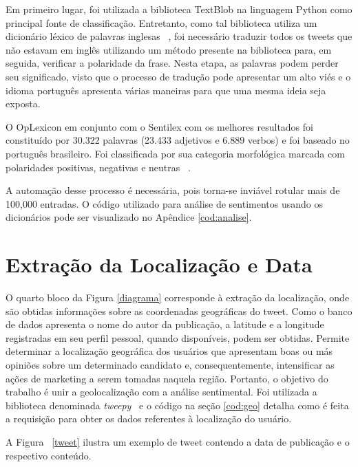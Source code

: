 Em primeiro lugar, foi utilizada a biblioteca TextBlob na linguagem Python como principal fonte de classificação. Entretanto, 
como tal biblioteca utiliza um dicionário léxico de palavras inglesas ~\cite{miller1995wordnet}, foi necessário traduzir todos os tweets que não estavam 
em inglês utilizando um método presente na biblioteca para, em seguida, verificar a polaridade da frase. Nesta etapa, as palavras
 podem perder seu significado, visto que o processo de tradução pode apresentar um alto viés e o idioma português apresenta várias maneiras para que uma mesma ideia seja exposta.


O OpLexicon em conjunto com o Sentilex com os melhores resultados foi constituído
por 30.322 palavras (23.433 adjetivos e 6.889 verbos) e foi
baseado no português brasileiro. Foi classificada por sua
categoria morfológica marcada com polaridades positivas,
negativas e neutras ~\cite{souza2011construction}.


A automação desse processo é necessária, pois torna-se inviável rotular mais de 100,000 entradas. 
O código utilizado para análise de sentimentos usando os dicionários pode ser visualizado no Apêndice
\ref{cod:analise}.


\section{Extração da Localização e Data}
\label{extract_timestamp}


O quarto bloco da Figura \ref{diagrama} corresponde à extração da
localização, onde são obtidas informações sobre as coordenadas
geográficas do tweet. Como o banco de dados apresenta
o nome do autor da publicação, a latitude e a longitude
registradas em seu perfil pessoal, quando disponíveis, podem
ser obtidas. Permite determinar a localização geográfica dos
usuários que apresentam boas ou más opiniões sobre um
determinado candidato e, consequentemente, intensificar as
ações de marketing a serem tomadas naquela região. Portanto,
o objetivo do trabalho é unir a geolocalização com a análise
sentimental. Foi utilizada a biblioteca denominada \textit{tweepy}~\cite{roesslein2009tweepy} e o código na seção \ref{cod:geo} detalha como é feita a requisição 
para obter os dados referentes à localização do usuário.

A Figura ~\ref{tweet} ilustra um exemplo de tweet contendo a data de publicação e o respectivo conteúdo.



%


